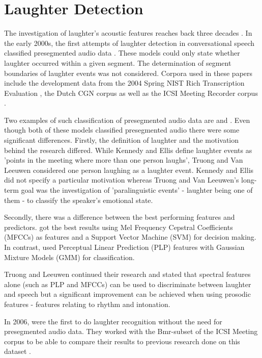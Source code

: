 \documentclass[bsc,frontabs,parskip,deptreport]{infthesis}
\begin{document}
\section{Laughter Detection} \label{sec:bg-laughter}
The investigation of laughter's acoustic features reaches back three decades \citep{bickley1992acoustic}.
In the early 2000s, the first attempts of laughter detection in conversational speech classified presegmented audio data \citep{kennedy2004laughter, truong2005automatic}. These models could only state whether laughter occurred within a given segment. The determination of segment boundaries of laughter events was not considered. 
Corpora used in these papers include the development data from the 2004 Spring NIST Rich Transcription Evaluation \citep{ldcnistcorpus}, the Dutch CGN corpus \citep{oostdijk2000spoken} as well as the ICSI Meeting Recorder corpus \citep{morgan2001meeting}. 

Two examples of such classification of presegmented audio data are \citeauthor{kennedy2004laughter} and \citeauthor{truong2005automatic}. 
Even though both of these models classified presegmented audio there were some significant differences. 
Firstly, the definition of laughter and the motivation behind the research differed.
While Kennedy and Ellis define laughter events as 'points in the meeting where more than one person laughs', Truong and Van Leeuwen considered one person laughing as a laughter event.
Kennedy and Ellis did not specify a particular motivation whereas Truong and Van Leeuwen's long-term goal was the investigation of 'paralinguistic events' - laughter being one of them - to classify the speaker's emotional state.   

Secondly, there was a difference between the best performing features and predictors.  
\citeauthor{kennedy2004laughter} got the best results using Mel Frequency Cepstral Coefficients (MFCCs) as features and a Support Vector Machine (SVM) for decision making. 
In contrast, \citeauthor{truong2005automatic} used Perceptual Linear Prediction (PLP) features with Gaussian Mixture Models (GMM) for classification. 

Truong and Leeuwen continued their research \citep{truong2007automatic} and stated that spectral features alone (such as PLP and MFCCs) can be used to discriminate between laughter and speech but a significant improvement can be achieved when using prosodic features - features relating to rhythm and intonation.

In 2006, \citeauthor{knox2006automatic} were the first to do laughter recognition without the need for presegmented audio data.  
They worked with the Bmr-subset of the ICSI Meeting corpus \citep{morgan2001meeting} to be able to compare their results to previous research done on this dataset \citep{kennedy2004laughter, truong2005automatic, truong2007automatic}.
\end{document}
